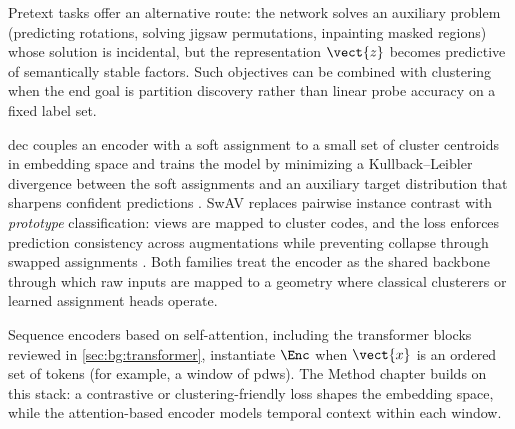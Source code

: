 Pretext tasks offer an alternative route: the network solves an auxiliary problem (predicting rotations, solving jigsaw permutations, inpainting masked regions) whose solution is incidental, but the representation \(\vect{z}\) becomes predictive of semantically stable factors.
Such objectives can be combined with clustering when the end goal is partition discovery rather than linear probe accuracy on a fixed label set.

\Gls{dec} couples an encoder with a soft assignment to a small set of cluster centroids in embedding space and trains the model by minimizing a Kullback--Leibler divergence between the soft assignments and an auxiliary target distribution that sharpens confident predictions \parencite{xie2016unsupervised}.
SwAV replaces pairwise instance contrast with \emph{prototype} classification: views are mapped to cluster codes, and the loss enforces prediction consistency across augmentations while preventing collapse through swapped assignments \parencite{caron2020swav}.
Both families treat the encoder as the shared backbone through which raw inputs are mapped to a geometry where classical clusterers or learned assignment heads operate.

Sequence encoders based on self-attention, including the transformer blocks reviewed in \cref{sec:bg:transformer}, instantiate \(\Enc\) when \(\vect{x}\) is an ordered set of tokens (for example, a window of \glspl{pdw}).
The Method chapter builds on this stack: a contrastive or clustering-friendly loss shapes the embedding space, while the attention-based encoder models temporal context within each window.
